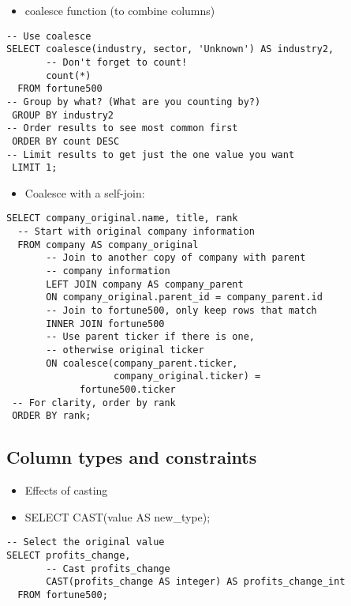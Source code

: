 \documentclass[]{book}
\providecommand{\tightlist}{%
  \setlength{\itemsep}{0pt}\setlength{\parskip}{0pt}}
\begin{document}
\begin{itemize}
\tightlist
\item
  coalesce function (to combine columns)
\end{itemize}

\begin{verbatim}
-- Use coalesce
SELECT coalesce(industry, sector, 'Unknown') AS industry2,
       -- Don't forget to count!
       count(*) 
  FROM fortune500 
-- Group by what? (What are you counting by?)
 GROUP BY industry2
-- Order results to see most common first
 ORDER BY count DESC
-- Limit results to get just the one value you want
 LIMIT 1;
\end{verbatim}

\begin{itemize}
\tightlist
\item
  Coalesce with a self-join:
\end{itemize}

\begin{verbatim}
SELECT company_original.name, title, rank
  -- Start with original company information
  FROM company AS company_original
       -- Join to another copy of company with parent
       -- company information
	   LEFT JOIN company AS company_parent
       ON company_original.parent_id = company_parent.id 
       -- Join to fortune500, only keep rows that match
       INNER JOIN fortune500 
       -- Use parent ticker if there is one, 
       -- otherwise original ticker
       ON coalesce(company_parent.ticker, 
                   company_original.ticker) = 
             fortune500.ticker
 -- For clarity, order by rank
 ORDER BY rank; 
\end{verbatim}

\hypertarget{column-types-and-constraints}{%
\subsection{Column types and constraints}\label{column-types-and-constraints}}

\begin{itemize}
\tightlist
\item
  Effects of casting
\item
  SELECT CAST(value AS new\_type);
\end{itemize}

\begin{verbatim}
-- Select the original value
SELECT profits_change, 
	   -- Cast profits_change
       CAST(profits_change AS integer) AS profits_change_int
  FROM fortune500;
\end{verbatim}
\end{document}
